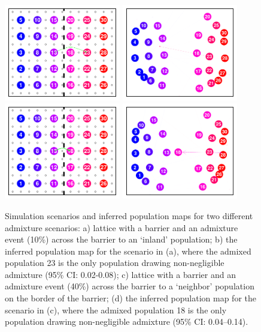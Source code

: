 \documentclass[10pt,letterpaper]{article}
\begin{document}
\begin{figure}[htp!]
	\centering
			{\includegraphics[width=2in,height=1.66in]{../figs/sims/barr_inland_ad_lattice.pdf}}
			{\includegraphics[width=2in,height=1.66in]{../figs/sims/GeoGenMap_barr_inland_admixture_1.pdf}}
			{\includegraphics[width=2in,height=1.66in]{../figs/sims/big_barr_ad_lattice.pdf}}
			{\includegraphics[width=2in,height=1.66in]{../figs/sims/GeoGenMap_big_barr_ad_1.pdf}}
	\caption{
    Simulation scenarios and inferred population maps for two different admixture scenarios: a) lattice with a barrier and an admixture event (10\%) across the barrier to an `inland' population; b) the inferred population map for the scenario in (a), where the admixed population 23 is the only population drawing non-negligible admixture (95\% CI: 0.02-0.08); c) lattice with a barrier and an admixture event (40\%) across the barrier to a `neighbor' population on the border of the barrier; (d) the inferred population map for the scenario in (c), where the admixed population 18 is the only population drawing non-negligible admixture (95\% CI: 0.04--0.14).
}\label{sfig:barr_inland_ad}
\end{figure}
\end{document}
